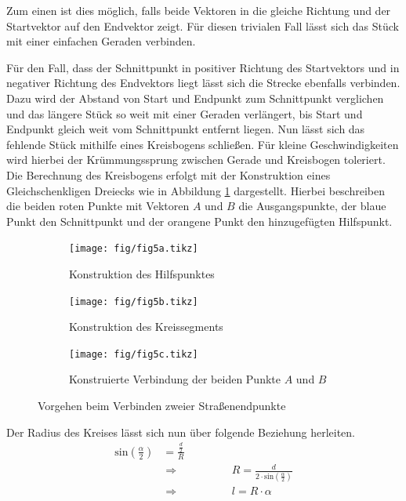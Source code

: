 Zum einen ist dies möglich, falls beide Vektoren in die gleiche Richtung und der Startvektor auf den Endvektor zeigt. Für diesen trivialen Fall lässt sich das Stück mit einer einfachen Geraden verbinden.

Für den Fall, dass der Schnittpunkt in positiver Richtung des Startvektors und in negativer Richtung des Endvektors liegt lässt sich die Strecke ebenfalls verbinden. Dazu wird der Abstand von Start und Endpunkt zum Schnittpunkt verglichen und das längere Stück so weit mit einer Geraden verlängert, bis Start und Endpunkt gleich weit vom Schnittpunkt entfernt liegen. Nun lässt sich das fehlende Stück mithilfe eines Kreisbogens schließen. Für kleine Geschwindigkeiten wird hierbei der Krümmungssprung zwischen Gerade und Kreisbogen toleriert. Die Berechnung des Kreisbogens erfolgt mit der Konstruktion eines Gleichschenkligen Dreiecks wie in Abbildung \ref{abb5} dargestellt. Hierbei beschreiben die beiden roten Punkte mit Vektoren \(A\) und \(B\) die Ausgangspunkte, der blaue Punkt den Schnittpunkt und der orangene Punkt den hinzugefügten Hilfspunkt.

\begin{figure}[!h]
\flushleft
\begin{subfigure}{0.32\textwidth}
\vspace{1.2cm}
\center \texttt{[image: fig/fig5a.tikz]}
\caption{Konstruktion des Hilfspunktes}
\end{subfigure}
\begin{subfigure}{0.32\textwidth}
\center \texttt{[image: fig/fig5b.tikz]}
\caption{Konstruktion des Kreissegments}
\end{subfigure}
\begin{subfigure}{0.32\textwidth}
\vspace{1.65cm}
\center \texttt{[image: fig/fig5c.tikz]}
\caption{Konstruierte Verbindung der beiden Punkte \(A\) und \(B\)}
\end{subfigure}
\caption{Vorgehen beim Verbinden zweier Straßenendpunkte}
\label{abb5}
\end{figure}

Der Radius des Kreises lässt sich nun über folgende Beziehung herleiten.
\begin{align}
\text{sin}(\frac{\alpha}{2}) &= \frac{\frac{d}{2}}{R} \\
&\Rightarrow \hspace{2cm} R = \frac{d}{2 \cdot \text{sin}(\frac{\alpha}{2})} \\
&\Rightarrow \hspace{2cm} l = R \cdot \alpha
\end{align}

